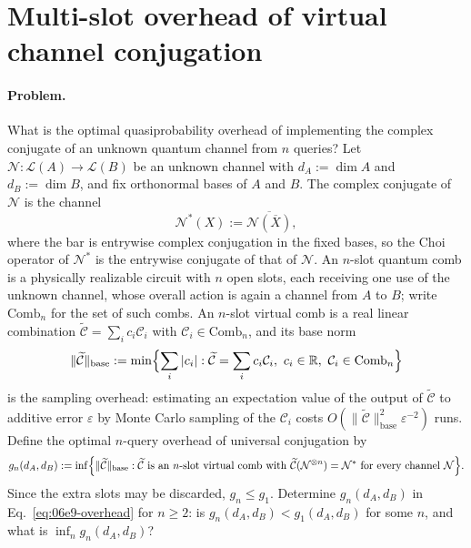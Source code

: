 \section{Multi-slot overhead of virtual channel conjugation}
\label{sec:op_06e9f0c7b3b62f3b}

\paragraph{Problem.}
What is the optimal quasiprobability overhead of implementing the complex
conjugate of an unknown quantum channel from $n$ queries?  Let
$\mathcal N:\mathcal L(A)\to\mathcal L(B)$ be an unknown channel with
$d_A:=\dim A$ and $d_B:=\dim B$, and fix orthonormal bases of $A$ and $B$.
The complex conjugate of $\mathcal N$ is the channel
\begin{equation}
  \mathcal N^{*}(X):=\overline{\mathcal N(\overline X)},
  \label{eq:06e9-conjugate}
\end{equation}
where the bar is entrywise complex conjugation in the fixed bases, so the
Choi operator of $\mathcal N^{*}$ is the entrywise conjugate of that of
$\mathcal N$.  An $n$-slot quantum comb is a physically realizable circuit
with $n$ open slots, each receiving one use of the unknown channel, whose
overall action is again a channel from $A$ to $B$; write
$\mathrm{Comb}_n$ for the set of such combs.  An $n$-slot virtual comb is
a real linear combination $\widetilde{\mathcal C}=\sum_i c_i\mathcal C_i$
with $\mathcal C_i\in\mathrm{Comb}_n$, and its base norm
\begin{equation}
  \|\widetilde{\mathcal C}\|_{\mathrm{base}}
  :=\min\Bigl\{\sum_i|c_i|:
    \widetilde{\mathcal C}=\sum_ic_i\mathcal C_i,\
    c_i\in\mathbb R,\ \mathcal C_i\in\mathrm{Comb}_n\Bigr\}
  \label{eq:06e9-base-norm}
\end{equation}
is the sampling overhead: estimating an expectation value of the output of
$\widetilde{\mathcal C}$ to additive error $\varepsilon$ by Monte Carlo
sampling of the $\mathcal C_i$ costs
$O(\|\widetilde{\mathcal C}\|_{\mathrm{base}}^{2}\varepsilon^{-2})$ runs.
Define the optimal $n$-query overhead of universal conjugation by
\begin{equation}
  g_n(d_A,d_B)
  :=\inf\Bigl\{\|\widetilde{\mathcal C}\|_{\mathrm{base}}:
    \widetilde{\mathcal C}\text{ is an $n$-slot virtual comb with }
    \widetilde{\mathcal C}(\mathcal N^{\otimes n})=\mathcal N^{*}
    \text{ for every channel }\mathcal N\Bigr\}.
  \label{eq:06e9-overhead}
\end{equation}
Since the extra slots may be discarded, $g_n\leq g_1$.  Determine
$g_n(d_A,d_B)$ in Eq.~\eqref{eq:06e9-overhead} for $n\geq2$: is
$g_n(d_A,d_B)<g_1(d_A,d_B)$ for some $n$, and what is
$\inf_{n}g_n(d_A,d_B)$?

